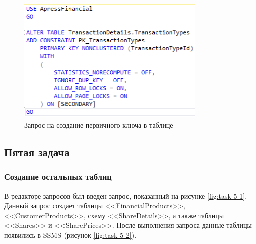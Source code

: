 \documentclass[a4paper, 14pt]{extarticle}
\begin{document}
\begin{figure}[H]
  \centering
  \includegraphics[width=0.8\textwidth]{images/task-4/3.png}
  \caption{Запрос на создание первичного ключа в таблице}
  \label{fig:task-4-3}
\end{figure}

\subsection{Пятая задача}

\subsubsection{Создание остальных таблиц}

В редакторе запросов был введен запрос, показанный на рисунке
\ref{fig:task-5-1}. Данный запрос создает таблицы <<FinancialProducts>>,
<<CustomerProducts>>, схему <<\foreignlanguage{english}{ShareDetails}>>, а также
таблицы <<Shares>> и <<SharePrices>>. После выполнения запроса данные таблицы
появились в SSMS (рисунок \ref{fig:task-5-2}).
\end{document}
